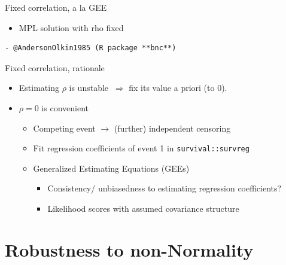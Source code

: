 \documentclass[10pt]{beamer}
\providecommand{\tightlist}{%
\setlength{\itemsep}{0pt}\setlength{\parskip}{0pt}}
\begin{document}
\begin{frame}[fragile]{Fixed correlation, a la GEE}
\protect\hypertarget{fixed-correlation-a-la-gee}{}

\begin{itemize}
\tightlist
\item
  MPL solution with rho fixed
\end{itemize}

\begin{verbatim}
- @AndersonOlkin1985 (R package **bnc**)
\end{verbatim}

\begin{block}{Fixed correlation, rationale}

\begin{itemize}
\tightlist
\item
  Estimating \(\rho\) is unstable \(\ \Rightarrow\) fix its value a priori (to 0).
\item
  \(\rho=0\) is convenient

  \begin{itemize}
  \tightlist
  \item
    Competing event \(\to\) (further) independent censoring
  \item
    Fit regression coefficients of event 1 in
    \texttt{survival::survreg}
  \item
    Generalized Estimating Equations (GEEs)

    \begin{itemize}
    \tightlist
    \item
      Consistency/ unbiasedness to estimating regression coefficients?
    \item
      Likelihood scores with assumed covariance structure
    \end{itemize}
  \end{itemize}
\end{itemize}
\end{block}

\end{frame}

\hypertarget{robustness-to-non-normality}{%
\section{Robustness to non-Normality}\label{robustness-to-non-normality}}
\end{document}
